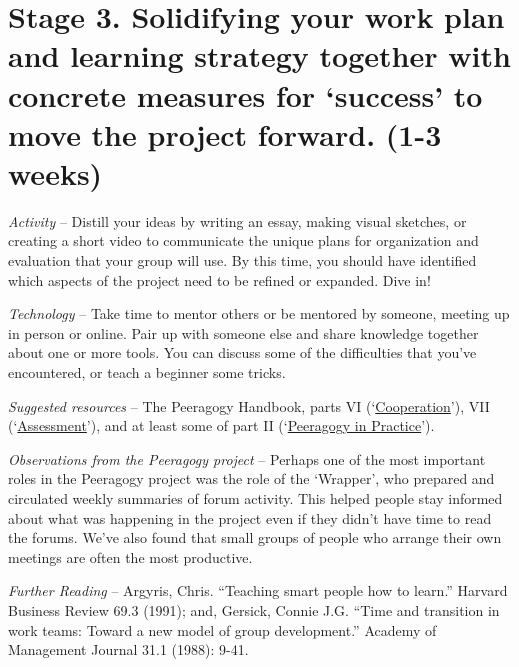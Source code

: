 
\section*{Stage 3. Solidifying your work plan and learning strategy
together with concrete measures for `success' to move the project
forward. (1-3
weeks)}\label{stage-3.-solidifying-your-work-plan-and-learning-strategy-together-with-concrete-measures-for-success-to-move-the-project-forward.-1-3-weeks}

\emph{Activity} -- Distill your ideas by writing an essay, making visual
sketches, or creating a short video to communicate the unique plans for
organization and evaluation that your group will use. By this time, you
should have identified which aspects of the project need to be refined
or expanded. Dive in!

\emph{Technology} -- Take time to mentor others or be mentored by
someone, meeting up in person or online. Pair up with someone else and
share knowledge together about one or more tools. You can discuss some
of the difficulties that you've encountered, or teach a beginner some
tricks.

\emph{Suggested resources} -- The Peeragogy Handbook, parts VI
(`\href{http://peeragogy.org/co-facilitation/}{Cooperation}'), VII
(`\href{http://peeragogy.org/assessment/}{Assessment}'), and at least
some of part II
(`\href{http://peeragogy.org/patterns-usecases/}{Peeragogy in
Practice}').

\emph{Observations from the Peeragogy project} -- Perhaps one of the
most important roles in the Peeragogy project was the role of the
`Wrapper', who prepared and circulated weekly summaries of forum
activity. This helped people stay informed about what was happening in
the project even if they didn't have time to read the forums. We've also
found that small groups of people who arrange their own meetings are
often the most productive.

\emph{Further Reading} -- Argyris, Chris. ``Teaching smart people how to
learn.'' Harvard Business Review 69.3 (1991); and, Gersick, Connie J.G.
``Time and transition in work teams: Toward a new model of group
development.'' Academy of Management Journal 31.1 (1988): 9-41.

